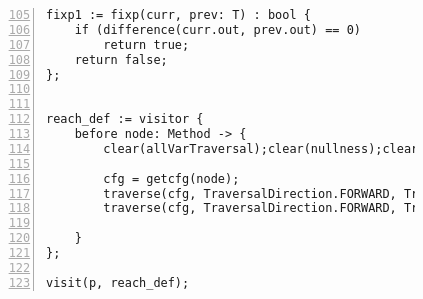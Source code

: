 \begin{figure}[ht!]
\begin{lstlisting}[numbers=left, tabsize=4, escapechar=@, caption={Nullness Analysis},label={lst:na-code}, firstline = 105, firstnumber=105]
fixp1 := fixp(curr, prev: T) : bool {
	if (difference(curr.out, prev.out) == 0)
		return true;	
	return false;
};


reach_def := visitor {
	before node: Method -> {
		clear(allVarTraversal);clear(nullness);clear(local);

		cfg = getcfg(node);
		traverse(cfg, TraversalDirection.FORWARD, TraversalKind.HYBRID, allVarTraversal);
		traverse(cfg, TraversalDirection.FORWARD, TraversalKind.HYBRID, nullness, fixp1);
			
	}
};

visit(p, reach_def);
\end{lstlisting}
\end{figure}